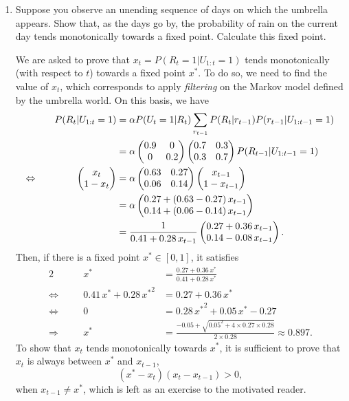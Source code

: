 \documentclass[11pt, a4paper]{article}
\begin{document}
\begin{enumerate}
    \item Suppose you observe an unending sequence of days on which the umbrella appears. Show that, as the days go by, the probability of rain on the current day tends monotonically towards a fixed point. Calculate this fixed point.

    \begin{solution}
        We are asked to prove that $x_t = P(R_t = 1 | U_{1:t} = 1)$ tends monotonically (with respect to $t$) towards a fixed point $x^*$. To do so, we need to find the value of $x_t$, which corresponds to apply \emph{filtering} on the Markov model defined by the umbrella world. On this basis, we have
        \begin{alignat*}{2}
            && P(R_t | U_{1:t} = 1) & = \alpha P(U_t = 1 | R_t) \sum_{r_{t-1}} P(R_t | r_{t-1}) P(r_{t-1} | U_{1:t-1}  = 1) \\
            &&& = \alpha \begin{pmatrix}0.9 & 0 \\ 0 & 0.2\end{pmatrix} \begin{pmatrix}0.7 & 0.3 \\ 0.3 & 0.7\end{pmatrix} P(R_{t-1} | U_{1:t-1} = 1) \\
            \Leftrightarrow \quad && \begin{pmatrix}x_{t} \\ 1 - x_{t}\end{pmatrix} & = \alpha \begin{pmatrix}0.63 & 0.27 \\ 0.06 & 0.14\end{pmatrix} \begin{pmatrix}x_{t-1} \\ 1 - x_{t-1}\end{pmatrix} \\
            &&& = \alpha \begin{pmatrix}0.27 + (0.63 - 0.27) \, x_{t-1} \\ 0.14 + (0.06 - 0.14) \, x_{t-1}\end{pmatrix} \\
            &&& = \frac{1}{0.41 + 0.28 \, x_{t-1}} \begin{pmatrix}0.27 + 0.36 \, x_{t-1} \\ 0.14 - 0.08 \, x_{t-1}\end{pmatrix} .
        \end{alignat*}
        Then, if there is a fixed point $x^* \in [0, 1]$, it satisfies
        \begin{alignat*}{2}
            && x^* & = \frac{0.27 + 0.36 \, x^*}{0.41 + 0.28 \, x^*} \\
            \Leftrightarrow \quad && 0.41 \, x^* + 0.28 \, {x^*}^2 & = 0.27 + 0.36 \, x^* \\
            \Leftrightarrow \quad && 0 & = 0.28 \, {x^*}^2 + 0.05 \, x^* - 0.27 \\
            \Rightarrow \quad && x^* & = \frac{-0.05 + \sqrt{0.05^2 + 4 \times 0.27 \times 0.28}}{2 \times 0.28} \approx \num{0.897} .
        \end{alignat*}
        To show that $x_t$ tends monotonically towards $x^*$, it is sufficient to prove that $x_t$ is always between $x^*$ and $x_{t-1}$, \ie{}
        \begin{equation*}
            (x^* - x_t) (x_t - x_{t-1}) > 0,
        \end{equation*}
        when $x_{t-1} \neq x^*$, which is left as an exercise to the motivated reader.
    \end{solution}


\end{enumerate}
\end{document}
